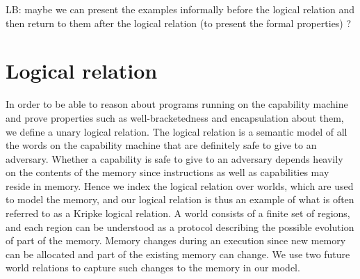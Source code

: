 \documentclass[compsoc,conference,letterpaper,fleqn]{IEEEtran}
\begin{document}
LB: maybe we can present the examples informally before the logical relation and then return to them after the logical relation (to present the formal properties) ?

\section{Logical relation}
In order to be able to reason about programs running on the capability
machine and prove properties such as well-bracketedness and
encapsulation about them, we define a unary logical relation.
The logical relation is a semantic model of all the words on the
capability machine that are definitely safe to give to an
adversary. Whether a capability is safe to give to an adversary
depends heavily on the contents of the memory since instructions as well
as capabilities may reside in memory. Hence we index the logical
relation over worlds, which are used to model the memory, and our logical
relation is thus an example of what is often referred to as a Kripke
logical relation. A world consists of a finite set of regions, and each region
can be understood as a protocol describing the possible evolution of
part of the memory. Memory changes during an
execution since new memory can be allocated and part of the existing
memory can change. We use two future world relations to capture
such changes to the memory in our model.
%
\end{document}
